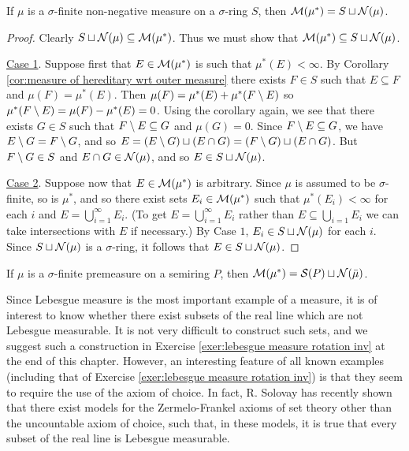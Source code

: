 \begin{theorem}\label{thm:null set completion sigma finite}
If $\mu$ is a $\sigma$-finite non-negative measure on a $\sigma$-ring $S$, then ${\cal M}(\mu^*)=S\sqcup{\cal N}(\mu)$.
\end{theorem}

\begin{proof}
Clearly $S\sqcup{\cal N}(\mu)\subseteq{\cal M}(\mu^*)$. Thus we must show that ${\cal M}(\mu^*)\subseteq S\sqcup{\cal N}(\mu)$.

\underline{Case 1}. Suppose first that $E\in{\cal M}(\mu^*)$ is such that $\mu^*(E)<\infty$. By Corollary \ref{cor:measure of hereditary wrt outer measure} there exists $F\in S$ such that $E\subseteq F$ and $\mu(F)=\mu^*(E)$. Then $\mu(F)=\mu^*(E)+\mu^*(F\setminus E)$ so $\mu^*(F\setminus E)=\mu(F)-\mu^*(E)=0$. Using the corollary again, we see that there exists $G\in S$ such that $F\setminus E\subseteq G$ and $\mu(G)=0$. Since $F\setminus E\subseteq G$, we have $E\setminus G=F\setminus G$, and so $E=(E\setminus G)\sqcup(E\cap G)=(F\setminus G)\sqcup(E\cap G)$. But $F\setminus G\in S$ and $E\cap G\in{\cal N}(\mu)$, and so $E\in S\sqcup{\cal N}(\mu)$.

\underline{Case 2}. Suppose now that $E\in{\cal M}(\mu^*)$ is arbitrary. Since $\mu$ is assumed to be $\sigma$-finite, so is $\mu^*$, and so there exist sets $E_i\in{\cal M}(\mu^*)$ such that $\mu^*(E_i)<\infty$ for each $i$ and $E=\bigcup_{i=1}^\infty E_i$. (To get $E=\bigcup_{i=1}^\infty E_i$ rather than $E\subseteq\bigcup_{i=1}E_i$ we can take intersections with $E$ if necessary.) By Case $1$, $E_i\in S\sqcup{\cal N}(\mu)$ for each $i$. Since $S\sqcup{\cal N}(\mu)$ is a $\sigma$-ring, it follows that $E\in S\sqcup{\cal N}(\mu)$.
\end{proof}

\begin{corollary}
If $\mu$ is a $\sigma$-finite premeasure on a semiring $P$, then ${\cal M}(\mu^*)={\cal S}(P)\sqcup{\cal N}(\bar{\mu})$.
\end{corollary}

Since Lebesgue measure is the most important example of a measure, it is of interest to know whether there exist subsets of the real line which are not Lebesgue measurable. It is not very difficult to construct such sets, and we suggest such a construction in Exercise \ref{exer:lebesgue measure rotation inv} at the end of this chapter. However, an interesting feature of all known examples (including that of Exercise \ref{exer:lebesgue measure rotation inv}) is that they seem to require the use of the axiom of choice. In fact, R. Solovay has recently shown that there exist models for the Zermelo-Frankel axioms of set theory other than the uncountable axiom of choice, such that, in these models, it is true that every subset of the real line is Lebesgue measurable.

